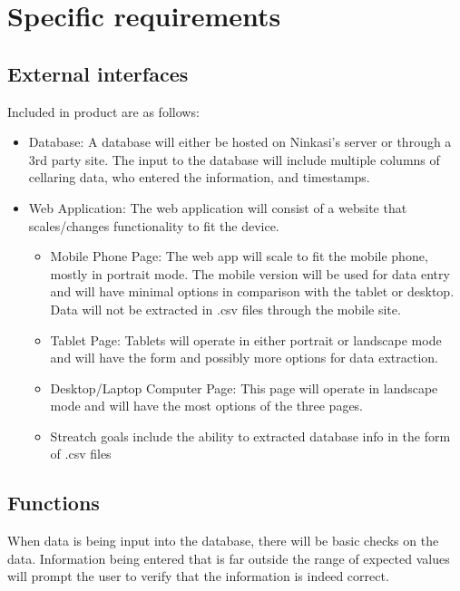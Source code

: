 \documentclass[draftclsnofoot,onecolumn,letterpaper,10pt,compsoc]{IEEEtran}
\begin{document}
\section{Specific requirements}
	\subsection{External interfaces}
    Included in product are as follows:
        \begin{itemize}
						\item{Database: A database will either be hosted on Ninkasi's server or through a 3rd party site.
						The input to the database will include multiple columns of cellaring data, who entered the information, and timestamps. }

            \item{Web Application:}
            The web application will consist of a website that scales/changes functionality to fit the device.

                \begin{itemize}
										\item{Mobile Phone Page: The web app will scale to fit the mobile phone, mostly in portrait mode.
										The mobile version will be used for data entry and will have minimal options in comparison with the tablet or desktop.
										Data will not be extracted in .csv files through the mobile site.}

                    \item{Tablet Page: Tablets will operate in either portrait or landscape mode and will have the form and possibly more options for data extraction.}

                    \item{Desktop/Laptop Computer Page: This page will operate in landscape mode and will have the most options of the three pages.}

                    \item{Streatch goals include the ability to extracted database info in the form of .csv files}
                \end{itemize}
        \end{itemize}

	\subsection{Functions}

		When data is being input into the database, there will be basic checks on the data.
		Information being entered that is far outside the range of expected values will prompt the user to verify that the information is indeed correct.
\end{document}
